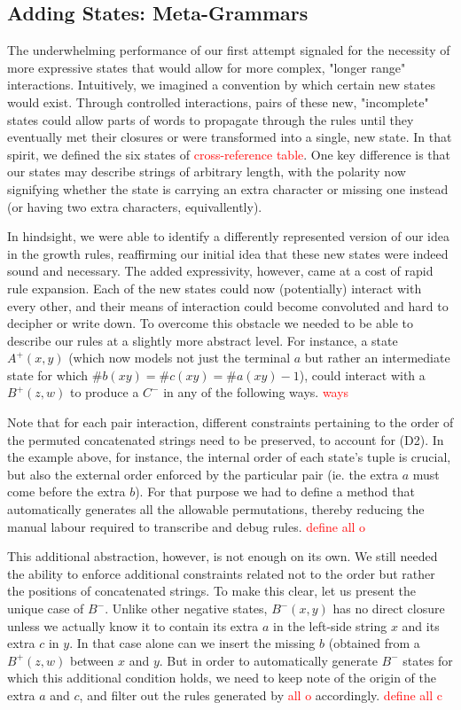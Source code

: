 \documentclass[nonatbib,numbers,10pt]{sigplanconf}
\newcommand\todo[1]{\textcolor{red}{#1}}
\begin{document}
\subsection{Adding States: Meta-Grammars}
The underwhelming performance of our first attempt signaled for the necessity of more expressive states that would allow for more complex, "longer range" interactions. Intuitively, we imagined a convention by which certain new states would exist. Through controlled interactions, pairs of these new, "incomplete" states could allow parts of words to propagate through the rules until they eventually met their closures or were transformed into a single, new state. In that spirit, we defined the six states of \todo{cross-reference table}. One key difference is that our states may describe strings of arbitrary length, with the polarity now signifying whether the state is carrying an extra character or missing one instead (or having two extra characters, equivallently).

In hindsight, we were able to identify a differently represented version of our idea in the growth rules, reaffirming our initial idea that these new states were indeed sound and necessary. The added expressivity, however, came at a cost of rapid rule expansion. Each of the new states could now (potentially) interact with every other, and their means of interaction could become convoluted and hard to decipher or write down. To overcome this obstacle we needed to be able to describe our rules at a slightly more abstract level. For instance, a state $A^{+}(x,y)$ (which now models not just the terminal $a$ but rather an intermediate state for which $ \# b(xy) = \# c(xy) = \# a(xy)-1$), could interact with a $B^{+}(z,w)$ to produce a $C^{-}$ in any of the following ways.
\todo{ways}

Note that for each pair interaction, different constraints pertaining to the order of the permuted concatenated strings need to be preserved, to account for (D2). In the example above, for instance, the internal order of each state's tuple is crucial, but also the external order enforced by the particular pair (ie. the extra $a$ must come before the extra $b$). For that purpose we had to define a method that automatically generates all the allowable permutations, thereby reducing the manual labour required to transcribe and debug rules. 
\todo{define all o}

This additional abstraction, however, is not enough on its own. We still needed the ability to enforce additional constraints related not to the order but rather the positions of concatenated strings. To make this clear, let us present the unique case of $B^{-}$. Unlike other negative states, $B^{-}(x,y)$ has no direct closure unless we actually know it to contain its extra $a$ in the left-side string $x$ and its extra $c$ in $y$. In that case alone can we insert the missing $b$ (obtained from a $B^{+}(z,w)$ between $x$ and $y$. But in order to automatically generate $B^{-}$ states for which this additional condition holds, we need to keep note of the origin of the extra $a$ and $c$, and filter out the rules generated by \todo{all o} accordingly. 
\todo{define all c}
\end{document}
